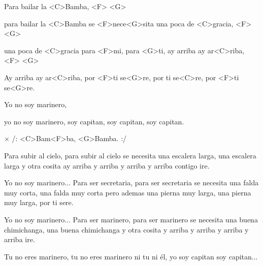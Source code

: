 
\zs
Para bailar la <C>Bamba, <F> <G> 

para bailar la <C>Bamba se <F>nece<G>sita
una poca de <C>gracia, <F> <G> 

una poca de <C>gracia para <F>mi, para <G>ti,
ay arriba ay ar<C>riba, <F> <G>

Ay arriba ay ar<C>riba, por <F>ti se<G>re,
por ti se<C>re, por <F>ti se<G>re.

Yo no soy marinero,

yo no soy marinero, soy capitan,
soy capitan, soy capitan.
\ks

× /: <C>Bam<F>ba, <G>Bamba. :/
\kr

\zs
Para subir al cielo,
para subir al cielo se necesita una escalera larga,
una escalera larga y otra cosita ay arriba y arriba
y arriba y arriba contigo ire.

Yo no soy marinero...
\ks
\zr \kr
\zs
Para ser secretaria,
para ser secretaria se necesita una falda muy corta,
una falda muy corta pero ademas una pierna muy larga,
una pierna muy larga, por ti sere.

Yo no soy marinero...
\ks
\zs
Para ser marinero,
para ser marinero se necesita una buena chimichanga,
una buena chimichanga y otra cosita y arriba y arriba
y arriba y arriba ire.

Tu no eres marinero, tu no eres marinero ni tu ni él,
yo soy capitan soy capitan...
\ks
\kp
